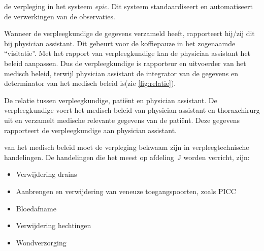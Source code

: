 \documentclass[nohyper,nobib]{tufte-book} %
\newcommand{\afdelingj}{afdeling~J }
\begin{document}
 de verpleging in het systeem \textit{epic}. Dit systeem standaardiseert en automatiseert de verwerkingen van de observaties. 

Wanneer de verpleegkundige de gegevens verzameld heeft, rapporteert hij/zij dit bij physician assistant. Dit gebeurt voor de koffiepauze in het zogenaamde ``visitatie''. Met het rapport van verpleegkundige kan de physician assistant het beleid aanpassen. Dus de verpleegkundige is rapporteur en uitvoerder van het medisch beleid, terwijl physician assistant de integrator van de gegevens en determinator van het medisch beleid is(zie \cref{fig:relatie}).
\begin{marginfigure}
    \caption{De relatie tussen verpleegkundige, patiënt en physician assistant. De verpleegkundige voert het medisch beleid van physician assistant en thoraxchirurg uit en verzamelt medische relevante gegevens van de patiënt. Deze gegevens rapporteert de verpleegkundige aan physician assistant.}
    \label{fig:relatie}
\end{marginfigure}
 van het medisch beleid moet de verpleging bekwaam zijn in verpleegtechnische handelingen. De handelingen die het meest op \afdelingj worden verricht, zijn:
    \begin{itemize}
        \item Verwijdering drains
        \item Aanbrengen en verwijdering van veneuze toegangspoorten, zoals PICC
        \item Bloedafname
        \item Verwijdering hechtingen
        \item Wondverzorging
    \end{itemize}
\end{document}

